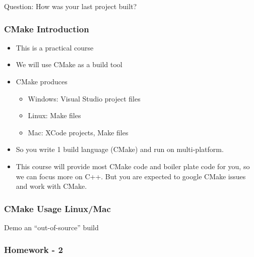 Question: How was your last project built?

\hypertarget{cmake-introduction}{%
\subsubsection{CMake Introduction}\label{cmake-introduction}}

\begin{itemize}
\tightlist
\item
  This is a practical course
\item
  We will use CMake as a build tool
\item
  CMake produces

  \begin{itemize}
  \tightlist
  \item
    Windows: Visual Studio project files
  \item
    Linux: Make files
  \item
    Mac: XCode projects, Make files
  \end{itemize}
\item
  So you write 1 build language (CMake) and run on multi-platform.
\item
  This course will provide most CMake code and boiler plate code for
  you, so we can focus more on C++. But you are expected to google CMake
  issues and work with CMake.
\end{itemize}

\hypertarget{cmake-usage-linuxmac}{%
\subsubsection{CMake Usage Linux/Mac}\label{cmake-usage-linuxmac}}

Demo an ``out-of-source'' build

\begin{Shaded}
\begin{Highlighting}[]
\end{Highlighting}
\end{Shaded}

\hypertarget{homework---2}{%
\subsubsection{Homework - 2}\label{homework---2}}

